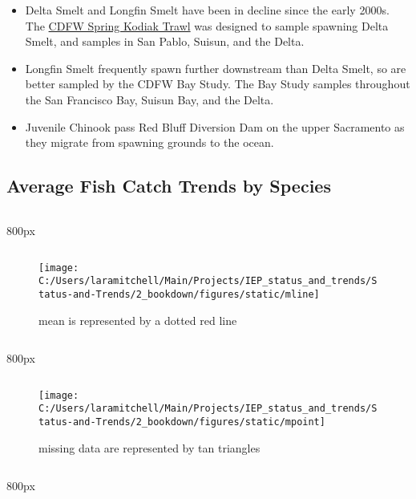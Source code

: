 \documentclass[
]{book}
\providecommand{\tightlist}{%
  \setlength{\itemsep}{0pt}\setlength{\parskip}{0pt}}
\begin{document}
\begin{itemize}
\tightlist
\item
  Delta Smelt and Longfin Smelt have been in decline since the early 2000s. The \href{https://www.wildlife.ca.gov/Conservation/Delta/Spring-Kodiak-Trawl}{CDFW Spring Kodiak Trawl} was designed to sample spawning Delta Smelt, and samples in San Pablo, Suisun, and the Delta.
\item
  Longfin Smelt frequently spawn further downstream than Delta Smelt, so are better sampled by the CDFW Bay Study. The Bay Study samples throughout the San Francisco Bay, Suisun Bay, and the Delta.
\item
  Juvenile Chinook pass Red Bluff Diversion Dam on the upper Sacramento as they migrate from spawning grounds to the ocean.
\end{itemize}

\hypertarget{average-fish-catch-trends-by-species-1}{%
\subsection{Average Fish Catch Trends by Species}\label{average-fish-catch-trends-by-species-1}}

\begin{columns-nocenter}

\begin{column}{800px\textwidth}
\begin{column}

\begin{figure}
\texttt{[image: C:/Users/laramitchell/Main/Projects/IEP\_status\_and\_trends/Status-and-Trends/2\_bookdown/figures/static/mline]} \caption{mean is represented by a dotted red line}\label{fig:unnamed-chunk-177}
\end{figure}

\end{column}
\end{column}

\begin{column}{800px\textwidth}
\begin{column}

\begin{figure}
\texttt{[image: C:/Users/laramitchell/Main/Projects/IEP\_status\_and\_trends/Status-and-Trends/2\_bookdown/figures/static/mpoint]} \caption{missing data are represented by tan triangles}\label{fig:unnamed-chunk-178}
\end{figure}

\end{column}
\end{column}

\begin{column}{800px\textwidth}
\begin{column}

\end{column}
\end{column}

\end{columns-nocenter}
\end{document}
